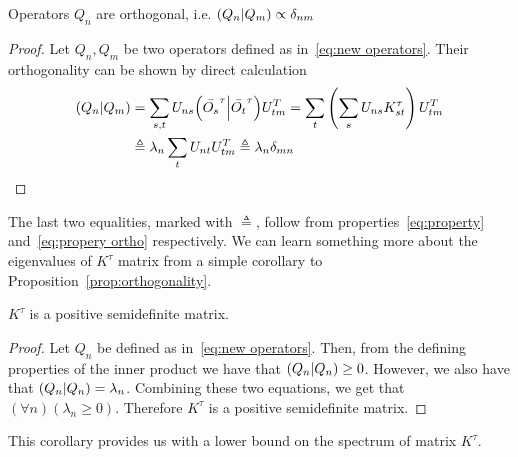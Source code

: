 \begin{proposition}
Operators \(Q_n\) are orthogonal, i.e. \(\left(Q_n \middle| Q_m\right) \propto \delta_{nm}\)
\label{prop:orthogonality}
\end{proposition}
\begin{proof}
  Let \(Q_n,Q_m\) be two operators defined as in~\eqref{eq:new operators}.
  Their orthogonality can be shown by direct calculation
  \begin{align*}
    \left(Q_n \middle| Q_m\right) &= \sum_{s,t} U_{ns} {\left(\bar{O_s}^{\tau} \middle| \bar{O_t}^{\tau}\right)} U_{tm}^{T} 
    = \sum_{t} \left(\sum_{s}U_{ns} K_{st}^{\tau}\right)  U_{tm}^{T} \\ 
    &\triangleq \lambda_n \sum_t U_{nt} U_{tm}^{T} \triangleq \lambda_n \delta_{mn}
  \end{align*}
\end{proof}
The last two equalities, marked with \(\triangleq \), follow from properties~\eqref{eq:property} 
and~\eqref{eq:propery ortho} respectively. We can learn something more
about the eigenvalues of \(K^{\tau}\) matrix from a simple corollary to Proposition~\ref{prop:orthogonality}.
\begin{corollary}
  \(K^{\tau}\) is a positive semidefinite matrix.\label{corr:psd}
\end{corollary}
\begin{proof}
Let \(Q_n\) be defined as in~\eqref{eq:new operators}. Then, from the defining properties of the inner product we have that
\(\left(Q_n \middle| Q_n\right) \geq 0\). However, we also have that \(\left(Q_n \middle| Q_n\right) = \lambda_n\). Combining these two equations, we get
that \(\left(\forall n\right) \left(\lambda_n \geq 0\right)\). Therefore \(K^{\tau}\) is a positive semidefinite matrix.
\end{proof}
This corollary provides us with a lower bound on the spectrum of matrix \(K^{\tau}\). 

